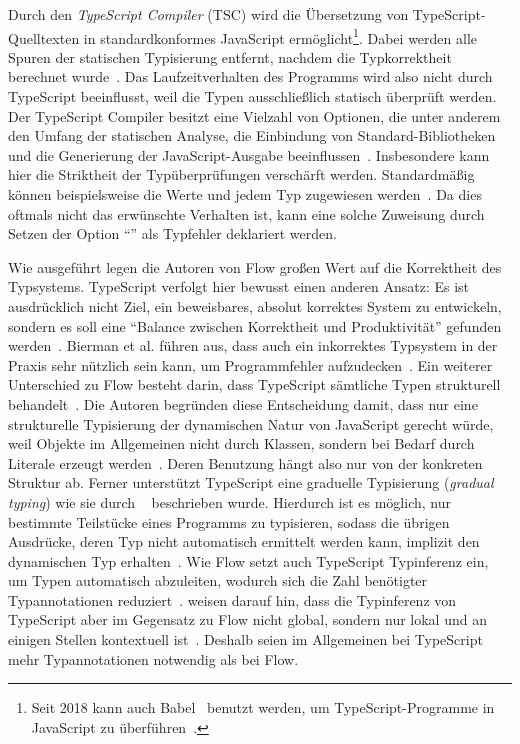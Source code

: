 Durch den \textit{TypeScript Compiler} (TSC) wird die Übersetzung von TypeScript-Quelltexten in standardkonformes JavaScript ermöglicht\footnote{Seit 2018 kann auch Babel~\autocite{BABEL} benutzt werden, um TypeScript-Programme in JavaScript zu überführen~\autocite{TYPESCRIPT:BABEL}.}. Dabei werden alle Spuren der statischen Typisierung entfernt, nachdem die Typkorrektheit berechnet wurde~\autocite[3]{BIERMAN:2014}. Das Laufzeitverhalten des Programms wird also nicht durch TypeScript beeinflusst, weil die Typen ausschließlich statisch überprüft werden. Der TypeScript Compiler besitzt eine Vielzahl von Optionen, die unter anderem den Umfang der statischen Analyse, die Einbindung von Standard-Bibliotheken und die Generierung der JavaScript-Ausgabe beeinflussen~\autocite{TSC:OPTIONS}. Insbesondere kann hier die Striktheit der Typüberprüfungen verschärft werden. Standardmäßig können beispielsweise die Werte  und  jedem Typ zugewiesen werden~\autocite{TSC:OPTIONS}. Da dies oftmals nicht das erwünschte Verhalten ist, kann eine solche Zuweisung durch Setzen der Option \enquote{} als Typfehler deklariert werden.

Wie ausgeführt legen die Autoren von Flow großen Wert auf die Korrektheit des Typsystems. TypeScript verfolgt hier bewusst einen anderen Ansatz: Es ist ausdrücklich nicht Ziel, ein beweisbares, absolut korrektes System zu entwickeln, sondern es soll eine \enquote{Balance zwischen Korrektheit und Produktivität} gefunden werden~\autocite{TYPESCRIPT:DESIGN_GOALS}. Bierman et al. führen aus, dass auch ein inkorrektes Typsystem in der Praxis sehr nützlich sein kann, um Programmfehler aufzudecken~\autocite[3]{BIERMAN:2014}. Ein weiterer Unterschied zu Flow besteht darin, dass TypeScript sämtliche Typen strukturell behandelt~\autocite[38]{TYPESCRIPT:SPEC}.
Die Autoren begründen diese Entscheidung damit, dass nur eine strukturelle Typisierung der dynamischen Natur von JavaScript gerecht würde, weil Objekte im Allgemeinen nicht durch Klassen, sondern bei Bedarf durch Literale erzeugt werden~\autocite[3]{BIERMAN:2014}. Deren Benutzung hängt also nur von der konkreten Struktur ab.
Ferner unterstützt TypeScript eine graduelle Typisierung (\textit{gradual typing}) wie sie durch \citeauthor{SIEK:2007}~\autocite{SIEK:2007} beschrieben wurde. Hierdurch ist es möglich, nur bestimmte Teilstücke eines Programms zu typisieren, sodass die übrigen Ausdrücke, deren Typ nicht automatisch ermittelt werden kann, implizit den dynamischen Typ  erhalten~\autocite{TYPESCRIPT:DESIGN_GOALS}. Wie Flow setzt auch TypeScript Typinferenz ein, um Typen automatisch abzuleiten, wodurch sich die Zahl benötigter Typannotationen reduziert~\autocite[4]{BIERMAN:2014}. \citeauthor{FLOW:PAPER} weisen darauf hin, dass die Typinferenz von TypeScript aber im Gegensatz zu Flow nicht global, sondern nur lokal und an einigen Stellen kontextuell ist~\autocite[24]{FLOW:PAPER}. Deshalb seien im Allgemeinen bei TypeScript mehr Typannotationen notwendig als bei Flow.

